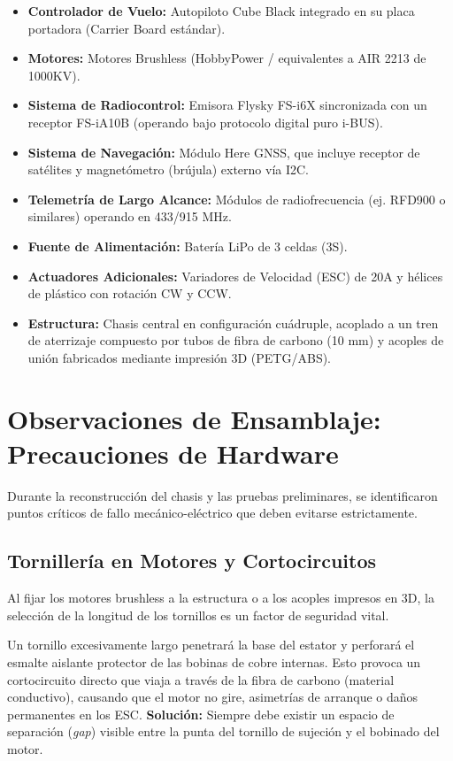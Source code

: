 \documentclass[12pt,a4paper]{article}
\begin{document}
\begin{itemize}[leftmargin=*]
    \item \textbf{Controlador de Vuelo:} Autopiloto Cube Black integrado en su placa portadora (Carrier Board estándar).
    \item \textbf{Motores:} Motores Brushless (HobbyPower / equivalentes a AIR 2213 de 1000KV). 
    \item \textbf{Sistema de Radiocontrol:} Emisora Flysky FS-i6X sincronizada con un receptor FS-iA10B (operando bajo protocolo digital puro i-BUS).
    \item \textbf{Sistema de Navegación:} Módulo Here GNSS, que incluye receptor de satélites y magnetómetro (brújula) externo vía I2C.
    \item \textbf{Telemetría de Largo Alcance:} Módulos de radiofrecuencia (ej. RFD900 o similares) operando en 433/915 MHz.
    \item \textbf{Fuente de Alimentación:} Batería LiPo de 3 celdas (3S).
    \item \textbf{Actuadores Adicionales:} Variadores de Velocidad (ESC) de 20A y hélices de plástico con rotación CW y CCW.
    \item \textbf{Estructura:} Chasis central en configuración cuádruple, acoplado a un tren de aterrizaje compuesto por tubos de fibra de carbono (10 mm) y acoples de unión fabricados mediante impresión 3D (PETG/ABS).
\end{itemize}

\section{Observaciones de Ensamblaje: Precauciones de Hardware}

Durante la reconstrucción del chasis y las pruebas preliminares, se identificaron puntos críticos de fallo mecánico-eléctrico que deben evitarse estrictamente.

\subsection{Tornillería en Motores y Cortocircuitos}
Al fijar los motores brushless a la estructura o a los acoples impresos en 3D, la selección de la longitud de los tornillos es un factor de seguridad vital.

\begin{warningbox}[title=El Problema de los Cortocircuitos]
Un tornillo excesivamente largo penetrará la base del estator y perforará el esmalte aislante protector de las bobinas de cobre internas. Esto provoca un cortocircuito directo que viaja a través de la fibra de carbono (material conductivo), causando que el motor no gire, asimetrías de arranque o daños permanentes en los ESC. \textbf{Solución:} Siempre debe existir un espacio de separación (\textit{gap}) visible entre la punta del tornillo de sujeción y el bobinado del motor.
\end{warningbox}
\end{document}
